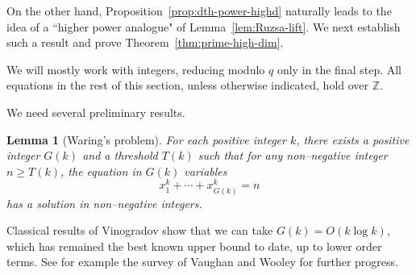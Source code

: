 \documentclass[12pt,reqno]{amsart}
\theoremstyle{plain}
\newtheorem{lemma}[theorem]{Lemma}
\theoremstyle{definition}
\newcommand{\Z}{\mathbb{Z}}
\newcommand{\1}{\mathbf{1}}
\begin{document}
On the other hand, Proposition~\ref{prop:dth-power-highd} naturally leads to the idea of a ``higher power analogue" of Lemma~\ref{lem:Ruzsa-lift}. We next establish such a result and prove Theorem~\ref{thm:prime-high-dim}.


We will mostly work with integers, reducing modulo $q$ only in the final step. All equations in the rest of this section, unless otherwise indicated, hold over $\Z$. 

We need several preliminary results.
\begin{lemma}[Waring's problem]
    \label{lem:waring}
    For each positive integer $k$, there exists a positive integer $G(k)$ and a threshold $T(k)$ such that for any non--negative integer $n \geq T(k)$, the equation in $G(k)$ variables
    $$x_1^k + \cdots + x_{G(k)}^k = n$$
    has a solution in non--negative integers.
\end{lemma}
Classical results of Vinogradov \cite{VinogradovWaring} show that we can take $G(k) = O(k \log k)$, which has remained the best known upper bound to date, up to lower order terms. See for example the survey of Vaughan and Wooley \cite{Waring} for further progress.
\end{document}
